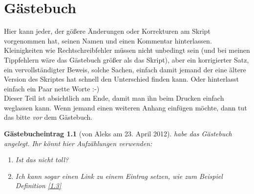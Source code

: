 \documentclass[a4paper,12pt]{report}
\theoremstyle{break}
\theoremstyle{nonumberbreak}
\newtheorem{gast}{G\"astebucheintrag}
\theoremstyle{nonumberplain}
\begin{document}


\chapter{G\"astebuch}
Hier kann jeder, der g\"o\ss ere \"Anderungen oder Korrekturen am Skript vorgenommen hat, seinen Namen und einen Kommentar hinterlassen. Kleinigkeiten wie Rechtschreibfehler m\"ussen nicht unbedingt sein (und bei meinen Tippfehlern w\"are das G\"astebuch gr\"o\ss er als das Skript), aber ein korrigierter Satz, ein vervollst\"andigter Beweis, solche Sachen, einfach damit jemand der eine \"altere Version des Skriptes hat schnell den Unterschied finden kann. Oder hinterlasst einfach ein Paar nette Worte :-)\\
Dieser Teil ist absichtlich am Ende, damit man ihn beim Drucken einfach weglassen kann. Wenn jemand einen weiteren Anhang einf\"ugen m\"ochte, dann tut das bitte \emph{vor} dem G\"astebuch.

\begin{gast}[von Aleks am 23. April 2012]
habe das G\"astebuch angelegt. Ihr k\"onnt hier Aufz\"ahlungen verwenden:
\begin{enumerate}[1)]
\item
	Ist das nicht toll?
\item
	Ich kann sogar einen Link zu einem Eintrag setzen, wie zum Beispiel Definition \ref{1.3}
\end{enumerate}
\end{gast}
\end{document}
